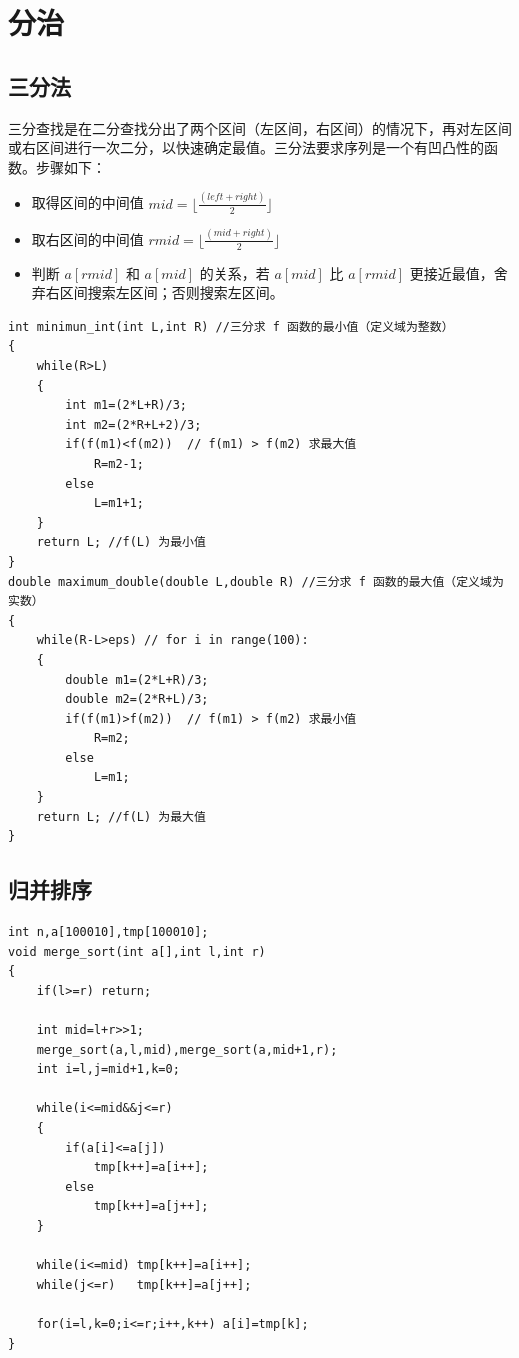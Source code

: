 \section{分治}
\subsection{三分法}
\noindent \par 三分查找是在二分查找分出了两个区间（左区间，右区间）的情况下，再对左区间或右区间进行一次二分，以快速确定最值。三分法要求序列是一个有凹凸性的函数。步骤如下：

\begin{itemize}
    \item 取得区间的中间值 $mid = \lfloor \frac{(left + right)}{2} \rfloor$
    \item 取右区间的中间值 $rmid = \lfloor \frac{(mid + right)}{2} \rfloor$
    \item 判断 $a[rmid]$ 和 $a[mid]$ 的关系，若 $a[mid]$ 比 $a[rmid]$ 更接近最值，舍弃右区间搜索左区间；否则搜索左区间。
\end{itemize}

\begin{verbatim}
int minimun_int(int L,int R) //三分求 f 函数的最小值（定义域为整数）
{
    while(R>L)
    {
        int m1=(2*L+R)/3;
        int m2=(2*R+L+2)/3;
        if(f(m1)<f(m2))  // f(m1) > f(m2) 求最大值
            R=m2-1;
        else
            L=m1+1;
    }
    return L; //f(L) 为最小值
}
double maximum_double(double L,double R) //三分求 f 函数的最大值（定义域为实数）
{
    while(R-L>eps) // for i in range(100):
    {
        double m1=(2*L+R)/3;
        double m2=(2*R+L)/3;
        if(f(m1)>f(m2))  // f(m1) > f(m2) 求最小值
            R=m2;
        else
            L=m1;
    }
    return L; //f(L) 为最大值
}
\end{verbatim}

\subsection{归并排序}
\begin{verbatim}
int n,a[100010],tmp[100010];
void merge_sort(int a[],int l,int r)
{
    if(l>=r) return;

    int mid=l+r>>1;
    merge_sort(a,l,mid),merge_sort(a,mid+1,r);
    int i=l,j=mid+1,k=0;

    while(i<=mid&&j<=r)
    {
        if(a[i]<=a[j])
            tmp[k++]=a[i++];
        else
            tmp[k++]=a[j++];
    }

    while(i<=mid) tmp[k++]=a[i++];
    while(j<=r)   tmp[k++]=a[j++];

    for(i=l,k=0;i<=r;i++,k++) a[i]=tmp[k];
}
\end{verbatim}

